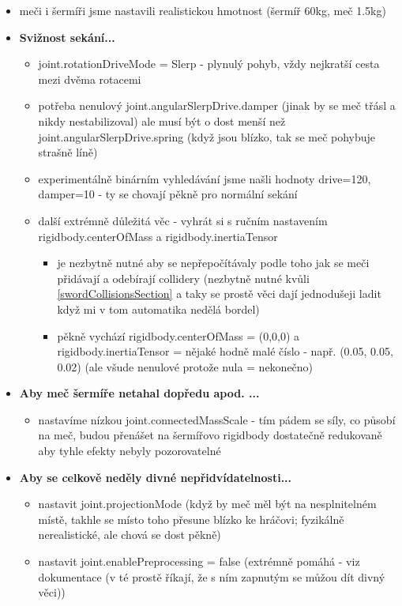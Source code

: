\begin{itemize}
  \item meči i šermíři jsme nastavili realistickou hmotnost (šermíř 60kg, meč 1.5kg)
  \item \textbf{Svižnost sekání...}
    \begin{itemize}
      \item joint.rotationDriveMode = Slerp - plynulý pohyb, vždy nejkratší cesta mezi dvěma rotacemi
      \item potřeba nenulový joint.angularSlerpDrive.damper (jinak by se meč třásl a nikdy nestabilizoval) ale musí být o dost menší než joint.angularSlerpDrive.spring (když jsou blízko, tak se meč pohybuje strašně líně)
      \item experimentálně binárním vyhledávání jsme našli hodnoty drive=120, damper=10 - ty se chovají pěkně pro normální sekání
      \item další extrémně důležitá věc - vyhrát si s ručním nastavením rigidbody.centerOfMass a rigidbody.inertiaTensor 
        \begin{itemize}
          \item je nezbytně nutné aby se nepřepočítávaly podle toho jak se meči přidávají a odebírají collidery (nezbytně nutné kvůli \ref{swordCollisionsSection} a taky se prostě věci dají jednodušeji ladit když mi v tom automatika nedělá bordel)
          \item pěkně vychází rigidbody.centerOfMass = (0,0,0) a rigidbody.inertiaTensor = nějaké hodně malé číslo - např. (0.05, 0.05, 0.02) (ale všude nenulové protože nula = nekonečno)
        \end{itemize}
    \end{itemize}
  \item \textbf{Aby meč šermíře netahal dopředu apod. ...}
    \begin{itemize}
      \item nastavíme nízkou joint.connectedMassScale - tím pádem se síly, co působí na meč, budou přenášet na šermířovo rigidbody dostatečně redukovaně aby tyhle efekty nebyly pozorovatelné
    \end{itemize}
  \item \textbf{Aby se celkově neděly divné nepřidvídatelnosti...}
      \begin{itemize}
        \item nastavit joint.projectionMode (když by meč měl být na nesplnitelném místě, takhle se místo toho přesune blízko ke hráčovi; fyzikálně nerealistické, ale chová se dost pěkně)
        \item nastavit joint.enablePreprocessing = false (extrémně pomáhá - viz dokumentace (v té prostě říkají, že s ním zapnutým se můžou dít divný věci))

\end{itemize}
\end{itemize}
